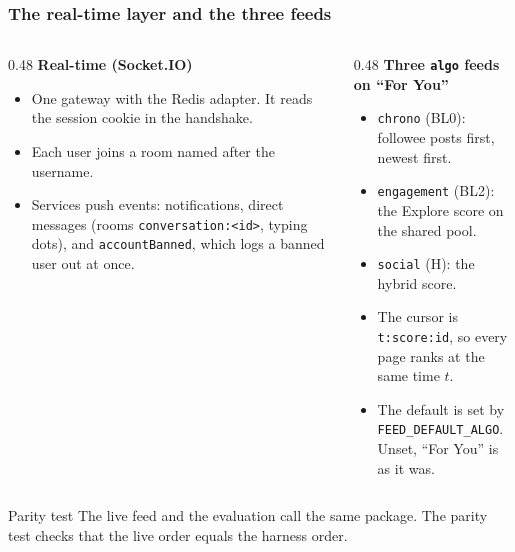 \documentclass[aspectratio=169,11pt]{beamer}
\begin{document}
\begin{frame}
  \frametitle{The real-time layer and the three feeds}
  \begin{columns}[T]
    \begin{column}{0.48\textwidth}
      \textbf{Real-time (Socket.IO)}
      \begin{itemize}\small
        \item One gateway with the Redis adapter. It reads the session cookie in the handshake.
        \item Each user joins a room named after the username.
        \item Services push events: notifications, direct messages (rooms \texttt{conversation:<id>}, typing dots), and \texttt{accountBanned}, which logs a banned user out at once.
      \end{itemize}
    \end{column}
    \begin{column}{0.48\textwidth}
      \textbf{Three \texttt{algo} feeds on ``For You''}
      \begin{itemize}\small
        \item \texttt{chrono} (BL0): followee posts first, newest first.
        \item \texttt{engagement} (BL2): the Explore score on the shared pool.
        \item \texttt{social} (H): the hybrid score.
        \item The cursor is \texttt{t:score:id}, so every page ranks at the same time $t$.
        \item The default is set by \texttt{FEED\_DEFAULT\_ALGO}. Unset, ``For You'' is as it was.
      \end{itemize}
    \end{column}
  \end{columns}
  \vspace{2mm}
  \begin{block}{Parity test}
    The live feed and the evaluation call the same package. The parity test checks that the live order equals the harness order.
  \end{block}
\end{frame}
\end{document}
